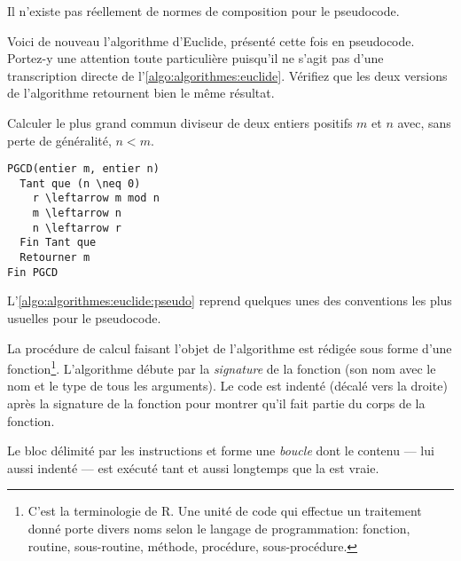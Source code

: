Il n'existe pas réellement de normes de composition pour le
pseudocode.

Voici de nouveau l'algorithme d'Euclide, présenté cette fois en
pseudocode. Portez-y une attention toute particulière puisqu'il ne
s'agit pas d'une transcription directe de
l'\autoref{algo:algorithmes:euclide}. Vérifiez que les deux versions
de l'algorithme retournent bien le même résultat.

\begingroup
\addtocounter{algorithme}{-1}
\renewcommand{\thealgorithme}{\ref*{algo:algorithmes:euclide}a}
\begin{algorithme}
  \label{algo:algorithmes:euclide:pseudo}
  Calculer le plus grand commun diviseur de deux entiers positifs $m$
  et $n$ avec, sans perte de généralité, $n < m$.
\begin{Schunk}
\begin{Verbatim}[commandchars=\\\{\}]
PGCD(entier m, entier n)
  Tant que (n \neq 0)
    r \leftarrow m mod n
    m \leftarrow n
    n \leftarrow r
  Fin Tant que
  Retourner m
Fin PGCD
\end{Verbatim}
\end{Schunk}
\end{algorithme}
\endgroup


L'\autoref{algo:algorithmes:euclide:pseudo} reprend quelques unes des
conventions les plus usuelles pour le pseudocode.

La procédure de calcul faisant l'objet de l'algorithme est rédigée
sous forme d'une fonction\footnote{%
  C'est la terminologie de R. Une unité de code qui effectue un
  traitement donné porte divers noms selon le langage de
  programmation: fonction, routine, sous-routine, méthode, procédure,
  sous-procédure.}. %
L'algorithme débute par la \emph{signature} de la
fonction (son nom avec le nom et le type de tous les arguments). Le
code est indenté (décalé vers la droite) après la signature de la
fonction pour montrer qu'il fait partie du corps de la fonction.

Le bloc délimité par les instructions  et  forme une
\emph{boucle} dont le contenu --- lui aussi indenté ---
est exécuté tant et aussi longtemps que la  est vraie.

